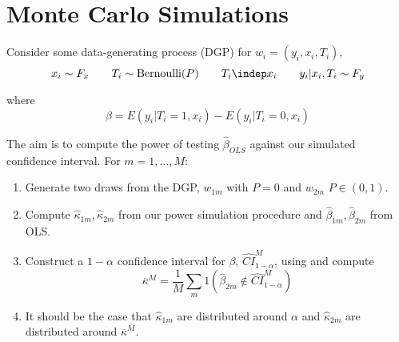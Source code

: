 \documentclass{article}
\begin{document}
\section{Monte Carlo Simulations}
\label{sec:monte_carlo_simulations}

Consider some data-generating process (DGP) for $w_i = (y_i, x_i, T_i)$,
\[
  x_i \sim F_x
  \quad\quad
  T_i \sim \text{Bernoulli}(P)
  \quad\quad
  T_i \indep x_i
  \quad\quad
  y_i | x_i, T_i \sim F_y
\]

where
\[
\beta = E(y_i | T_i = 1, x_i) - E(y_i | T_i = 0, x_i)
\]

The aim is to compute the power of testing $\widehat{\beta}_{OLS}$ against our simulated confidence interval. For $m = 1, \ldots, M$:
\begin{enumerate}
\item Generate two draws from the DGP, $w_{1m}$ with $P = 0$ and $w_{2m}$ $P \in (0, 1)$.

\item Compute $\widehat{\kappa}_{1m}, \widehat{\kappa}_{2m}$ from our power simulation procedure and $\widehat{\beta}_{1m}, \widehat{\beta}_{2m}$ from OLS.

\item Construct a $1 - \alpha$ confidence interval for $\beta$, $\widehat{CI}^M_{1 - \alpha}$, using  and compute
\[
  \overline{\kappa}^M = \dfrac{1}{M} \sum^{}_{m} 1\left(
      \widehat{\beta}_{2m} \notin \widehat{CI}^M_{1 - \alpha}
  \right)
\]

\item It should be the case that $\widehat{\kappa}_{1m}$ are distributed around $\alpha$ and $\widehat{\kappa}_{2m}$ are distributed around $\overline{\kappa}^M$.
\end{enumerate}

%



\end{document}

